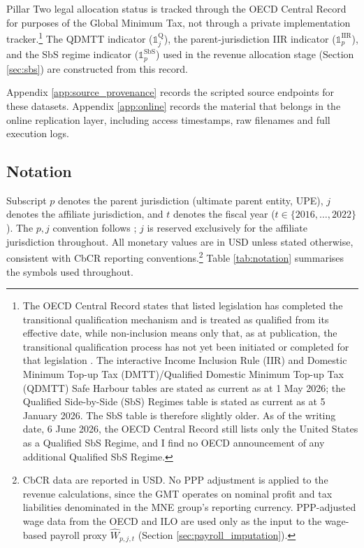 \documentclass[11pt,a4paper]{article}
\begin{document}
Pillar Two legal allocation status is tracked through the OECD Central Record for purposes of the Global Minimum Tax, not through a private implementation tracker.\footnote{The OECD Central Record states that listed legislation has completed the transitional qualification mechanism and is treated as qualified from its effective date, while non-inclusion means only that, as at publication, the transitional qualification process has not yet been initiated or completed for that legislation \citep{oecdCentralRecord2026}. The interactive Income Inclusion Rule (IIR) and Domestic Minimum Top-up Tax (DMTT)/Qualified Domestic Minimum Top-up Tax (QDMTT) Safe Harbour tables are stated as current as at 1 May 2026; the Qualified Side-by-Side (SbS) Regimes table is stated as current as at 5 January 2026. The SbS table is therefore slightly older. As of the writing date, 6 June 2026, the OECD Central Record still lists only the United States as a Qualified SbS Regime, and I find no OECD announcement of any additional Qualified SbS Regime.} The QDMTT indicator ($\mathbb{1}_j^{\text{Q}}$), the parent-jurisdiction IIR indicator ($\mathbb{1}_p^{\text{IIR}}$), and the SbS regime indicator ($\mathbb{1}_p^{\text{SbS}}$) used in the revenue allocation stage (Section \ref{sec:sbs}) are constructed from this record.

Appendix \ref{app:source_provenance} records the scripted source endpoints for these datasets. Appendix \ref{app:online} records the material that belongs in the online replication layer, including access timestamps, raw filenames and full execution logs.

\subsection{Notation}\label{sec:notation}

Subscript $p$ denotes the parent jurisdiction (ultimate parent entity, UPE), $j$ denotes the affiliate jurisdiction, and $t$ denotes the fiscal year ($t \in \{2016, \ldots, 2022\}$). The $p,j$ convention follows \citet{barake2022}; $j$ is reserved exclusively for the affiliate jurisdiction throughout. All monetary values are in USD unless stated otherwise, consistent with CbCR reporting conventions.\footnote{CbCR data are reported in USD. No PPP adjustment is applied to the revenue calculations, since the GMT operates on nominal profit and tax liabilities denominated in the MNE group's reporting currency. PPP-adjusted wage data from the OECD and ILO are used only as the input to the wage-based payroll proxy $\hat{W}_{p,j,t}$ (Section \ref{sec:payroll_imputation}).} Table \ref{tab:notation} summarises the symbols used throughout.
\end{document}
